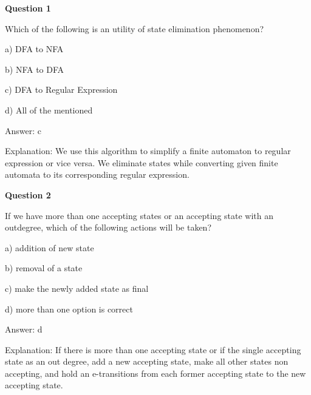 \documentclass{article}
\begin{document}
\begin{mdframed}[linewidth=1pt, roundcorner=5pt, linecolor=gray!30, backgroundcolor=gray!5]
\textbf{Question 1} 

Which of the following is an utility of state elimination phenomenon?

a) DFA to NFA

b) NFA to DFA

c) DFA to Regular Expression

d) All of the mentioned
\vspace{5pt} \par
\begin{tcolorbox}[colback=green!5, colframe=green!40!black, title=Solution]
Answer: c

Explanation: We use this algorithm to simplify a finite automaton to regular expression or vice versa. We eliminate states while converting given finite automata to its corresponding regular expression.
\end{tcolorbox}
\end{mdframed}

\begin{mdframed}[linewidth=1pt, roundcorner=5pt, linecolor=gray!30, backgroundcolor=gray!5]
\textbf{Question 2} 

If we have more than one accepting states or an accepting state with an outdegree, which of the following actions will be taken?

a) addition of new state

b) removal of a state

c) make the newly added state as final

d) more than one option is correct
\vspace{5pt} \par
\begin{tcolorbox}[colback=green!5, colframe=green!40!black, title=Solution]
Answer: d

Explanation: If there is more than one accepting state or if the single accepting state as an out degree, add a new accepting state, make all other states non accepting, and hold an e-transitions from each former accepting state to the new accepting state.
\end{tcolorbox}
\end{mdframed}
\end{document}
